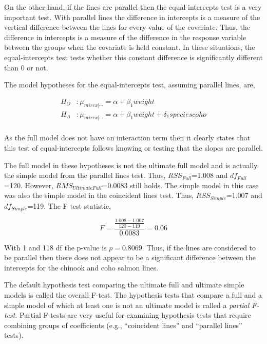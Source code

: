 \documentclass[10pt,openany]{book}\usepackage[]{graphicx}\usepackage[]{color}
\begin{document}
On the other hand, if the lines are parallel then the equal-intercepts test is a very important test.  With parallel lines the difference in intercepts is a measure of the vertical difference between the lines for every value of the covariate.  Thus, the difference in intercepts is a measure of the difference in the response variable between the groups when the covariate is held constant.  In these situations, the equal-intercepts test tests whether this constant difference is significantly different than 0 or not.


The model hypotheses for the equal-intercepts test, assuming parallel lines, are,

\[ \begin{split}
  H_{O}&: \mu_{mirex|\cdots} = \alpha+\beta_{1}weight \\
  H_{A}&: \mu_{mirex|\cdots} = \alpha+\beta_{1}weight+\delta_{1}speciescoho \\
\end{split} \]

As the full model does not have an interaction term then it clearly states that this test of equal-intercepts follows knowing or testing that the slopes are parallel.



The full model in these hypotheses is not the ultimate full model and is actually the simple model from the parallel lines test.  Thus, $RSS_{Full}$=1.008 and $df_{Full}$=120.  However, $RMS_{Ultimate Full}$=0.0083 still holds.  The simple model in this case was also the simple model in the coincident lines test.  Thus, $RSS_{Simple}$=1.007 and $df_{Simple}$=119.  The F test statistic,

\[ F = \frac{\frac{1.008-1.007}{120-119}}{0.0083} = 0.06 \]

With 1 and 118 df the p-value is $p=0.8069$.  Thus, if the lines are considered to be parallel then there does not appear to be a significant difference between the intercepts for the chinook and coho salmon lines.

The default hypothesis test comparing the ultimate full and ultimate simple models is called the overall F-test.  The hypothesis tests that compare a full and a simple model of which at least one is not an ultimate model is called a \emph{partial F-test}.  Partial F-tests are very useful for examining hypothesis tests that require combining groups of coefficients (e.g., ``coincident lines'' and ``parallel lines'' tests).
\end{document}
